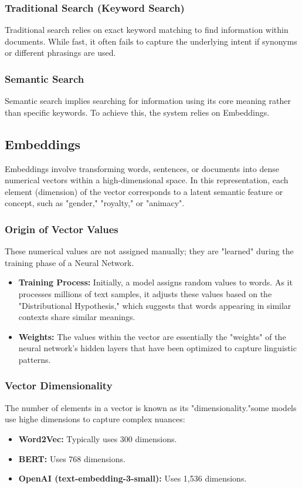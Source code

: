 \subsubsection{Traditional Search (Keyword Search)}
Traditional search relies on exact keyword matching to find information within documents. While fast, it often fails to capture the underlying intent if synonyms or different phrasings are used.

\subsubsection{Semantic Search}
Semantic search implies searching for information using its core meaning rather than specific keywords. To achieve this, the system relies on Embeddings.

\subsection{Embeddings}
Embeddings involve transforming words, sentences, or documents into dense numerical vectors within a high-dimensional space. In this representation, each element (dimension) of the vector corresponds to a latent semantic feature or concept, such as "gender," "royalty," or "animacy".

\subsubsection{Origin of Vector Values}
These numerical values are not assigned manually; they are "learned" during the training phase of a Neural Network. 
\begin{itemize}
    \item \textbf{Training Process:} Initially, a model assigns random values to words. As it processes millions of text samples, it adjusts these values based on the "Distributional Hypothesis," which suggests that words appearing in similar contexts share similar meanings.
    \item \textbf{Weights:} The values within the vector are essentially the "weights" of the neural network's hidden layers that have been optimized to capture linguistic patterns.
\end{itemize}

\subsubsection{Vector Dimensionality}
The number of elements in a vector is known as its "dimensionality."some models use  highe dimensions to capture complex nuances:
\begin{itemize}
    \item \textbf{Word2Vec:} Typically uses 300 dimensions.
    \item \textbf{BERT:} Uses 768 dimensions.
    \item \textbf{OpenAI (text-embedding-3-small):} Uses 1,536 dimensions.
\end{itemize}

